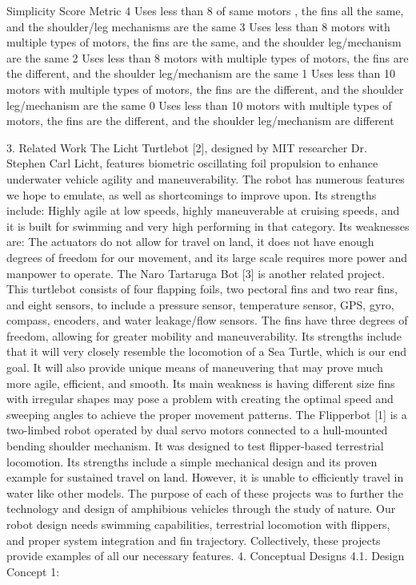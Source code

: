 Simplicity 
Score
Metric
4
Uses less than 8 of same motors , the fins all the same, and the shoulder/leg mechanisms are the same 
3
Uses less than 8 motors with multiple types of motors, the fins are the same, and the  shoulder leg/mechanism are the same 
2
Uses less than 8 motors with multiple types of motors, the fins are the different, and the shoulder leg/mechanism are the same 
1
Uses less than 10 motors with multiple types of motors, the fins are the different, and the shoulder leg/mechanism are the same 
0
Uses less than 10 motors with multiple types of motors, the fins are the different, and the shoulder leg/mechanism are different 



    3. Related Work
The Licht Turtlebot [2], designed by MIT researcher Dr. Stephen Carl Licht, features biometric oscillating foil propulsion to enhance underwater vehicle agility and maneuverability. The robot has numerous features we hope to emulate, as well as shortcomings to improve upon. Its strengths include: Highly agile at low speeds, highly maneuverable at cruising speeds, and it is built for swimming and very high performing in that category. Its weaknesses are: The actuators do not allow for travel on land, it does not have enough degrees of freedom for our movement, and its large scale requires more power and manpower to operate. 
The Naro Tartaruga Bot [3] is another related project. This turtlebot consists of four flapping foils, two pectoral fins and two rear fins, and eight sensors, to include a pressure sensor, temperature sensor, GPS, gyro, compass, encoders, and water leakage/flow sensors. The fins have three degrees of freedom, allowing for greater mobility and maneuverability. Its strengths include that it will very closely resemble the locomotion of a Sea Turtle, which is our end goal. It will also provide unique means of maneuvering that may prove much more agile, efficient, and smooth. Its main weakness is having different size fins with irregular shapes may pose a problem with creating the optimal speed and sweeping angles to achieve the proper movement patterns.
The Flipperbot [1] is a two-limbed robot operated by dual servo motors connected to a hull-mounted bending shoulder mechanism. It was designed to test flipper-based terrestrial locomotion. Its strengths include a simple mechanical design and its proven example for sustained travel on land. However, it is unable to efficiently travel in water like other models. 
The purpose of each of these projects was to further the technology and design of amphibious vehicles through the study of nature. Our robot design needs swimming capabilities, terrestrial locomotion with flippers, and proper system integration and fin trajectory. Collectively, these projects provide examples of all our necessary features. 
    4. Conceptual Designs
        4.1. Design Concept 1: 

